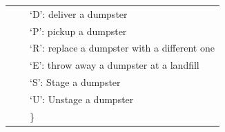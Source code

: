 \documentclass{article}
\begin{document}
\begin{tabular}{ l | l | l }
                               & $                                                           $  &  `D': deliver a dumpster                                      \\
                               & $                                                           $  &  `P': pickup a dumpster                                       \\
                               & $                                                           $  &  `R': replace a dumpster with a different one                 \\
                               & $                                                           $  &  `E': throw away a dumpster at a landfill                     \\
                               & $                                                           $  &  `S': Stage a dumpster                                        \\
                               & $                                                           $  &  `U': Unstage a dumpster                                      \\
                               & $                                                           $  & \}                                                            \\
\end{tabular}
\end{document}
